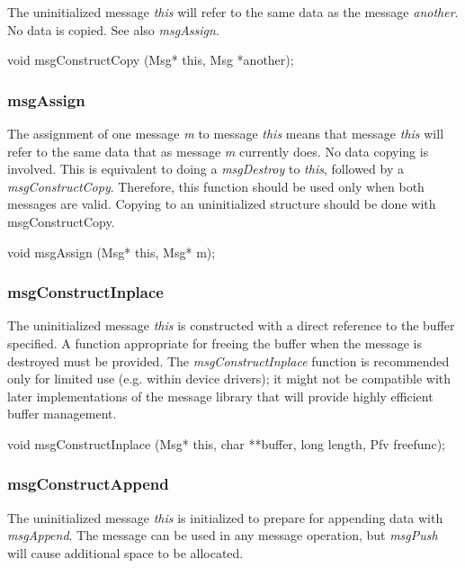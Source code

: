 The uninitialized message {\em this} will refer to the same data as
the message {\em another}.  No data is copied.  See also {\em
msgAssign}.

\medskip

{\sem void} {\bold msgConstructCopy} ({\sem Msg*} {\caps this}, {\sem Msg} *{\caps another});

\subsubsection{msgAssign}

The assignment of one message {\em m} to message {\em this} means that
message {\em this} will refer to the same data that as message {\em m}
currently does.  No data copying is involved.  This is equivalent to
doing a {\em msgDestroy} to {\em this}, followed by a {\em
msgConstructCopy}.  Therefore, this function should be used only when
both messages are valid.  Copying to an uninitialized structure should
be done with msgConstructCopy.
\medskip

{\sem void} {\bold msgAssign} ({\sem Msg*} {\caps this}, {\sem Msg*} {\caps m});
\medskip

\subsubsection{msgConstructInplace}

The uninitialized message {\em this} is constructed with a direct
reference to the buffer specified.  A function appropriate for freeing
the buffer when the message is destroyed must be provided.  The {\em
msgConstructInplace} function is recommended only for limited use
(e.g. within device drivers); it might not be compatible with later
implementations of the message library that will provide highly
efficient buffer management.

\medskip

{\sem void} {\bold msgConstructInplace} ({\sem Msg*} {\caps this},
	{\sem char} **{\caps buffer},
	{\sem long} {\caps length},
	{\sem Pfv} {\caps freefunc});

\subsubsection{msgConstructAppend}

The uninitialized message {\em this} is initialized to prepare for
appending data with {\em msgAppend}.  The message can be used in any
message operation, but {\em msgPush} will cause additional space to be
allocated.

